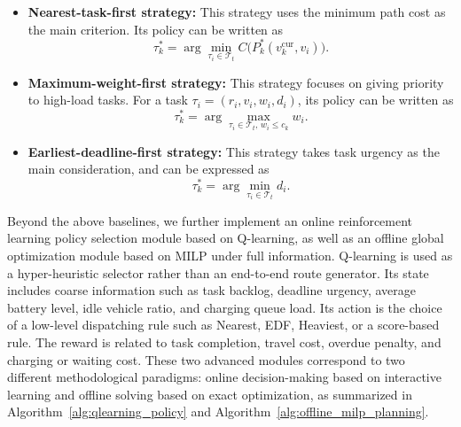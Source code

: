 \begin{itemize}
\item \textbf{Nearest-task-first strategy:} This strategy uses the minimum path cost as the main criterion. Its policy can be written as
\[
\tau_k^*=\arg\min_{\tau_i\in \mathcal{T}_t} C\bigl(P_k^*(v_k^{\text{cur}}, v_i)\bigr).
\]

\item \textbf{Maximum-weight-first strategy:} This strategy focuses on giving priority to high-load tasks. For a task \(\tau_i=(r_i,v_i,w_i,d_i)\), its policy can be written as
\[
\tau_k^*=\arg\max_{\tau_i\in \mathcal{T}_t,\, w_i\le c_k} w_i.
\]

\item \textbf{Earliest-deadline-first strategy:} This strategy takes task urgency as the main consideration, and can be expressed as
\[
\tau_k^*=\arg\min_{\tau_i\in \mathcal{T}_t} d_i.
\]
\end{itemize}

\begin{table}[htbp]
\centering
\caption{Roles of algorithms and strategies in the system.}
\label{tab:algorithm_roles}
\end{table}

Beyond the above baselines, we further implement an online reinforcement learning policy selection module based on Q-learning, as well as an offline global optimization module based on MILP under full information. Q-learning is used as a hyper-heuristic selector rather than an end-to-end route generator. Its state includes coarse information such as task backlog, deadline urgency, average battery level, idle vehicle ratio, and charging queue load. Its action is the choice of a low-level dispatching rule such as Nearest, EDF, Heaviest, or a score-based rule. The reward is related to task completion, travel cost, overdue penalty, and charging or waiting cost. These two advanced modules correspond to two different methodological paradigms: online decision-making based on interactive learning and offline solving based on exact optimization, as summarized in Algorithm~\ref{alg:qlearning_policy} and Algorithm~\ref{alg:offline_milp_planning}.


